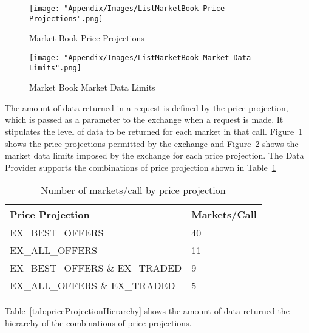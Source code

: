 		\begin{figure}[H]
			\centering
			\texttt{[image: "Appendix/Images/ListMarketBook Price Projections".png]}
			\caption{Market Book Price Projections}
    			\label{fig:marketBookPriceProjections}
		\end{figure}

		\begin{figure}[H]
			\centering
			\texttt{[image: "Appendix/Images/ListMarketBook Market Data Limits".png]}
			\caption{Market Book Market Data Limits}
    			\label{fig:marketBookDataLimits}
		\end{figure}
	
	The amount of data returned in a request is defined by the price projection, which is passed as a parameter to the exchange when a request is made. It stipulates the level of data to be returned for each market in that call. Figure~\ref{fig:marketBookPriceProjections} shows the price projections permitted by the exchange and Figure~\ref{fig:marketBookDataLimits} shows the market data limits imposed by the exchange for each price projection. The Data Provider supports the combinations of price projection shown in Table~\ref{tab:marketsPerCall}
	
		\begin{table}[h]
			\centering
			\begin{tabular}{ll}
				Price Projection 					& Markets/Call\\
				\toprule					
				{EX\_BEST\_OFFERS} 					& 40\\
				{EX\_ALL\_OFFERS} 					& 11\\
				{EX\_BEST\_OFFERS \& EX\_TRADED}    	& 9\\
				{EX\_ALL\_OFFERS \& EX\_TRADED}		& 5\\
			\end{tabular}
			\caption{Number of markets/call by price projection}
			\label{tab:marketsPerCall}
		\end{table}
		
		Table~\ref{tab:priceProjectionHierarchy} shows the amount of data returned the hierarchy of the combinations of price projections.
		
